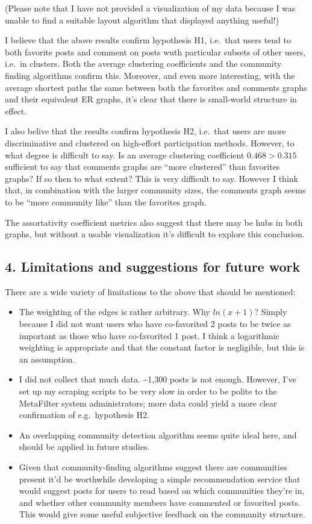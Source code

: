 (Please note that I have not provided a visualization of my data because
I was unable to find a suitable layout algorithm that displayed anything
useful!)

I believe that the above results confirm hypothesis H1, i.e.~that users
tend to both favorite posts and comment on posts wuth particular subsets
of other users, i.e.~in clusters. Both the average clustering
coefficients and the community finding algorithms confirm this.
Moreover, and even more interesting, with the average shortest paths the
same between both the favorites and comments graphs and their equivalent
ER graphs, it's clear that there is small-world structure in effect.

I also belive that the results confirm hypothesis H2, i.e.~that users
are more discriminative and clustered on high-effort participation
methods. However, to what degree is difficult to say. Is an average
clustering coefficient $0.468 > 0.315$ sufficient to say that comments
graphs are ``more clustered'' than favorites graphs? If so then to what
extent? This is very difficult to say. However I think that, in
combination with the larger community sizes, the comments graph seems to
be ``more community like'' than the favorites graph.

The assortativity coefficient metrics also suggest that there may be
hubs in both graphs, but without a usable visualization it's difficult
to explore this conclusion.

\subsection{4. Limitations and suggestions for future work}

There are a wide variety of limitations to the above that should be
mentioned:

\begin{itemize}
\item
  The weighting of the edges is rather arbitrary. Why $ln(x+1)$? Simply
  because I did not want users who have co-favorited 2 posts to be twice
  as important as those who have co-favorited 1 post. I think a
  logarithmic weighting is appropriate and that the constant factor is
  negligible, but this is an assumption.
\item
  I did not collect that much data. \textasciitilde{}1,300 posts is not
  enough. However, I've set up my scraping scripts to be very slow in
  order to be polite to the MetaFilter system administrators; more data
  could yield a more clear confirmation of e.g.~hypothesis H2.
\item
  An overlapping community detection algorithm seems quite ideal here,
  and should be applied in future studies.
\item
  Given that community-finding algorithms suggest there are communities
  present it'd be worthwhile developing a simple recommendation service
  that would suggest posts for users to read based on which communities
  they're in, and whether other community members have commented or
  favorited posts. This would give some useful subjective feedback on
  the community structure.
\end{itemize}
